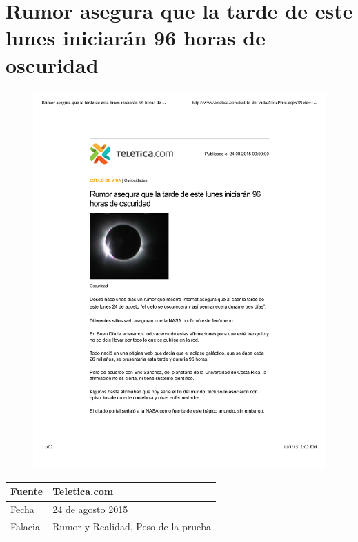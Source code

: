 \documentclass[times]{simauth}
\begin{document}
\section{Rumor asegura que la tarde de este lunes iniciarán 96 horas de oscuridad }
\begin{figure}[h!]
    \centering
    \includegraphics[width=17cm]{teletica-rumor}
    \label{fig:falacia2}
\end{figure}

\begin{table}[h!]
    \begin{tabular}{ll} 
        \toprule[1.5pt]
        Fuente & Teletica.com\\
        \midrule[0.5pt]
        Fecha  & 24 de agosto 2015\\
        \midrule[0.5pt]
        Falacia & Rumor y Realidad, Peso de la prueba \\
        \bottomrule[1.5pt]
    \end{tabular} 
\end{table}
\end{document}
